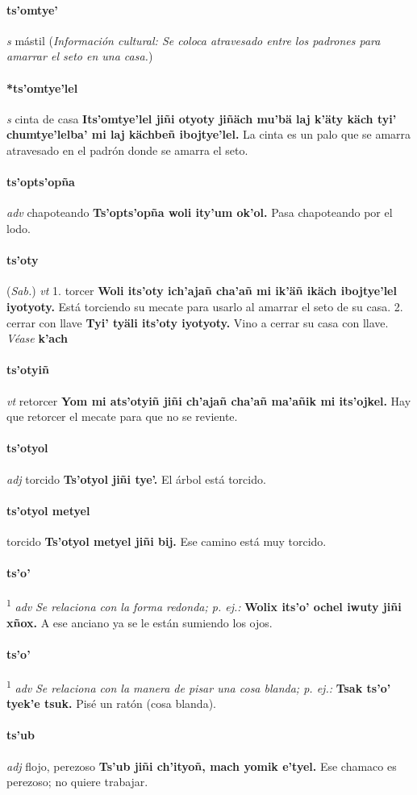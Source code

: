 \documentclass{scrbook}
\newcommand{\entry}[1]{\paragraph{#1}}
\newcommand{\onedefinition}[1]{#1.}
\newcommand{\defsuperscript}[1]{\textsuperscript{1}}
\newcommand{\nontranslationdef}[1]{\textit{#1}}
\newcommand{\partofspeech}[1]{\textit{#1}}
\newcommand{\spanishtranslation}[1]{#1}
\newcommand{\cholexample}[1]{\textbf{#1}}
\newcommand{\exampletranslation}[1]{#1}
\newcommand{\alsosee}[1]{\\\textit{Véase} \textbf{#1}}
\newcommand{\relevantdialect}[1]{(\textit{#1})}
\newcommand{\culturalinformation}[1]{(\textit{#1})}
\begin{document}
\begin{multicols}{2}
\entry{ts'omtye'}
\partofspeech{s}
\spanishtranslation{mástil}
\culturalinformation{Información cultural: Se coloca atravesado entre los padrones para amarrar el seto en una casa.}

\entry{*ts'omtye'lel}
\partofspeech{s}
\spanishtranslation{cinta de casa}
\cholexample{Its'omtye'lel jiñi otyoty jiñäch mu'bä laj k'äty käch tyi' chumtye'lelba' mi laj kächbeñ ibojtye'lel.}
\exampletranslation{La cinta es un palo que se amarra atravesado en el padrón donde se amarra el seto.}

\entry{ts'opts'opña}
\partofspeech{adv}
\spanishtranslation{chapoteando}
\cholexample{Ts'opts'opña woli ity'um ok'ol.}
\exampletranslation{Pasa chapoteando por el lodo.}

\entry{ts'oty}
\relevantdialect{Sab.}
\partofspeech{vt}
\onedefinition{1}
\spanishtranslation{torcer}
\cholexample{Woli its'oty ich'ajañ cha'añ mi ik'äñ ikäch ibojtye'lel iyotyoty.}
\exampletranslation{Está torciendo su mecate para usarlo al amarrar el seto de su casa.}
\onedefinition{2}
\spanishtranslation{cerrar con llave}
\cholexample{Tyi' tyäli its'oty iyotyoty.}
\exampletranslation{Vino a cerrar su casa con llave.}
\alsosee{k'ach}

\entry{ts'otyiñ}
\partofspeech{vt}
\spanishtranslation{retorcer}
\cholexample{Yom mi ats'otyiñ jiñi ch'ajañ cha'añ ma'añik mi its'ojkel.}
\exampletranslation{Hay que retorcer el mecate para que no se reviente.}

\entry{ts'otyol}
\partofspeech{adj}
\spanishtranslation{torcido}
\cholexample{Ts'otyol jiñi tye'.}
\exampletranslation{El árbol está torcido.}

\entry{ts'otyol metyel}
\spanishtranslation{torcido}
\cholexample{Ts'otyol metyel jiñi bij.}
\exampletranslation{Ese camino está muy torcido.}

\entry{ts'o'}
\defsuperscript{1}
\partofspeech{adv}
\nontranslationdef{Se relaciona con la forma redonda; p. ej.:}
\cholexample{Wolix its'o' ochel iwuty jiñi xñox.}
\exampletranslation{A ese anciano ya se le están sumiendo los ojos.}

\entry{ts'o'}
\defsuperscript{2}
\partofspeech{adv}
\nontranslationdef{Se relaciona con la manera de pisar una cosa blanda; p. ej.:}
\cholexample{Tsak ts'o' tyek'e tsuk.}
\exampletranslation{Pisé un ratón (cosa blanda).}

\entry{ts'ub}
\partofspeech{adj}
\spanishtranslation{flojo, perezoso}
\cholexample{Ts'ub jiñi ch'ityoñ, mach yomik e'tyel.}
\exampletranslation{Ese chamaco es perezoso; no quiere trabajar.}


\end{multicols}
\end{document}
